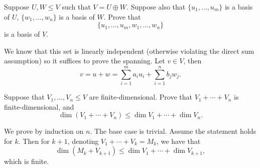 \begin{prbm}
Suppose $U,W\le V$ such that $V=U\oplus W$. Suppose also that $\{u_1,\dots,u_m\}$ is a basis of $U$, $\{w_1,\dots,w_n\}$ is a basis of $W$. Prove that
\[\{u_1,\dots,u_m,w_1,\dots,w_n\}\]
is a basis of $V$.
\end{prbm}

\begin{solution}
We know that this set is linearly independent (otherwise violating the direct sum assumption) so it suffices to prove the spanning. Let $v\in V$, then
\[v=u+w=\sum_{i=1}^{m}a_iu_i+\sum_{i=1}^{n}b_jw_j.\]
\end{solution}

\begin{prbm}

\end{prbm}

\begin{prbm}

\end{prbm}

\begin{prbm}
Suppose that $V_1,\dots,V_n\le V$ are finite-dimensional. Prove that $V_1+\cdots+V_n$ is finite-dimensional, and
\[\dim(V_1+\cdots+V_n)\le\dim V_1+\cdots+\dim V_n.\]
\end{prbm}

\begin{solution}
We prove by induction on $n$. The base case is trivial. Assume the statement holds for $k$. Then for $k+1$, denoting $V_1+\cdots+V_k=M_k$, we have that
\[\dim(M_k+V_{k+1})\le\dim V_1+\cdots+\dim V_{k+1},\]
which is finite.
\end{solution}